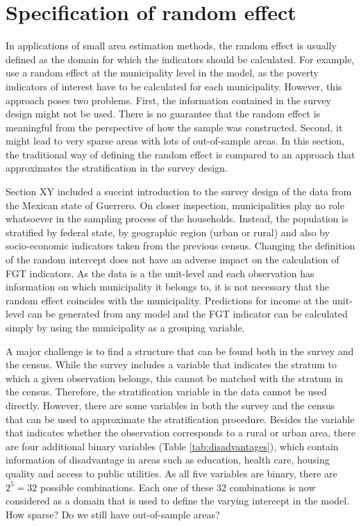 \section{Specification of random effect}
In applications of small area estimation methods, the random effect is usually defined as the domain for which the indicators should be calculated.
For example, \cite{rojas_perilla_data_2020} use a random effect at the municipality level in the model, as the poverty indicators of interest have to be calculated for each municipality.
However, this approach poses two problems.
First, the information contained in the survey design might not be used.
There is no guarantee that the random effect is meaningful from the perspective of how the sample was constructed.
Second, it might lead to very sparse areas with lots of out-of-sample areas.
In this section, the traditional way of defining the random effect is compared to an approach that approximates the stratification in the survey design.

Section XY included a succint introduction to the survey design of the data from the Mexican state of Guerrero.
On closer inspection, municipalities play no role whatsoever in the sampling process of the households.
Instead, the population is stratified by federal state, by geographic region (urban or rural) and also by socio-economic indicators taken from the previous census.
Changing the definition of the random intercept does not have an adverse impact on the calculation of FGT indicators.
As the data is a the unit-level and each observation has information on which municipality it belongs to, it is not necessary that the random effect coincides with the municipality.
Predictions for income at the unit-level can be generated from any model and the FGT indicator can be calculated simply by using the municipality as a grouping variable.

A major challenge is to find a structure that can be found both in the survey and the census.
While the survey includes a variable that indicates the stratum to which a given observation belongs, this cannot be matched with the stratum in the census.
Therefore, the stratification variable in the data cannot be used directly.
However, there are some variables in both the survey and the census that can be used to approximate the stratification procedure.
Besides the  variable that indicates whether the observation corresponds to a rural or urban area, there are four additional binary variables (Table \ref{tab:disadvantages}), which contain information of disadvantage in areas such as education, health care, housing quality and access to public utilities.
As all five variables are binary, there are $2^5 = 32$ possible combinations.
Each one of these 32 combinations is now considered as a domain that is used to define the varying intercept in the model.
How sparse? Do we still have out-of-sample areas?

